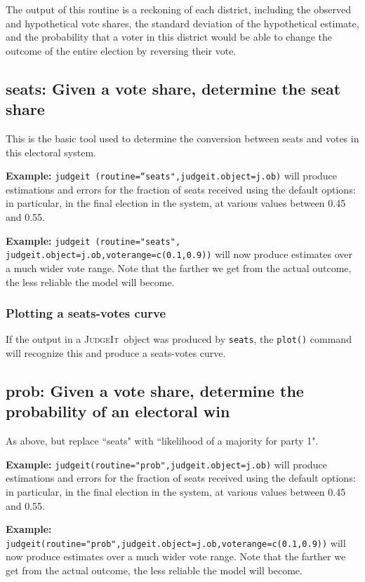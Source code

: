 \documentclass[oneside,letterpaper,titlepage]{article}
\newcommand{\JudgeIt}{\textsc{JudgeIt}\ }
\newcommand{\jud}{\texttt{judgeit}\ }
\begin{document}
The output of this routine is a reckoning of each district, including
the observed and hypothetical vote shares, the standard deviation of
the hypothetical estimate, and the probability that a voter in this
district would be able to change the outcome of the entire election by
reversing their vote.

\subsection{seats: Given a vote share, determine the seat share}

This is the basic tool used to determine the conversion between seats
and votes in this electoral system.

\textbf{Example:}
\jud\texttt{(routine=``seats",judgeit.object=j.ob)} will produce
estimations and errors for the fraction of seats received using the
default options: in particular, in the final election in the system,
at various values between 0.45 and 0.55.

\textbf{Example:} \jud\texttt{(routine="seats", judgeit.object=j.ob,voterange=c(0.1,0.9))} will now produce estimates
over a much wider vote range. Note that the farther we get from the
actual outcome, the less reliable the model will become.

\subsubsection{Plotting a seats-votes curve}

If the output in a \JudgeIt object was produced by \texttt{seats}, the
\texttt{plot()} command will recognize this and produce a seats-votes
curve.

\subsection{prob: Given a vote share, determine the probability of an electoral win}

As above, but replace ``seats" with ``likelihood of a majority for
party 1".

\textbf{Example:} \texttt{judgeit(routine="prob",judgeit.object=j.ob)}
will produce estimations and errors for the fraction of seats received
using the default options: in particular, in the final election in the
system, at various values between 0.45 and 0.55.

\textbf{Example:} \texttt{judgeit(routine="prob",judgeit.object=j.ob,voterange=c(0.1,0.9))}
will now produce estimates over a much wider vote range. Note that the
farther we get from the actual outcome, the less reliable the model
will become.
\end{document}

